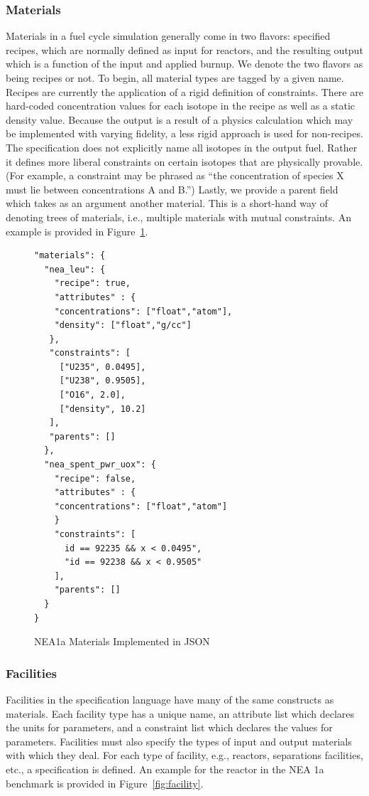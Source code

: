 \subsubsection{Materials}
Materials in a fuel cycle simulation generally come in two flavors: specified
recipes, which are normally defined as input for reactors, and the resulting
output which is a function of the input and applied burnup. We denote the two
flavors as being recipes or not. To begin, all material types are tagged by a
given name. Recipes are currently the application of a rigid definition of
constraints. There are hard-coded concentration values for each isotope in the
recipe as well as a static density value. Because the output is a result of a
physics calculation which may be implemented with varying fidelity, a less rigid
approach is used for non-recipes. The specification does not explicitly name all
isotopes in the output fuel. Rather it defines more liberal constraints on
certain isotopes that are physically provable.  (For example, a constraint may be
phrased as ``the concentration of species X must lie between concentrations A
and B.'') Lastly, we provide a parent field which takes as an argument another
material. This is a short-hand way of denoting trees of materials, i.e.,
multiple materials with mutual constraints. An example is provided in
Figure~\ref{fig:material}.

\begin{figure}[h!]
\begin{Verbatim}[frame=single]
"materials": {
  "nea_leu": {
    "recipe": true,
    "attributes" : {
    "concentrations": ["float","atom"],
    "density": ["float","g/cc"]
   },
   "constraints": [        
     ["U235", 0.0495],
     ["U238", 0.9505],
     ["O16", 2.0],
     ["density", 10.2]
   ], 
   "parents": []
  },
  "nea_spent_pwr_uox": {
    "recipe": false,
    "attributes" : {
    "concentrations": ["float","atom"]
    }
    "constraints": [
      id == 92235 && x < 0.0495",
      "id == 92238 && x < 0.9505"
    ], 
    "parents": []
  }
}
\end{Verbatim}
\caption{NEA1a Materials Implemented in JSON}
\label{fig:material}
\end{figure}

\subsubsection{Facilities}
Facilities in the specification language have many of the same constructs as
materials. Each facility type has a unique name, an attribute list which
declares the units for parameters, and a constraint list which declares the
values for parameters. Facilities must also specify the types of input and
output materials with which they deal. For each type of facility, e.g., reactors,
separations facilities, etc., a specification is defined. An example for the
reactor in the NEA 1a benchmark is provided in Figure~\ref{fig:facility}.

